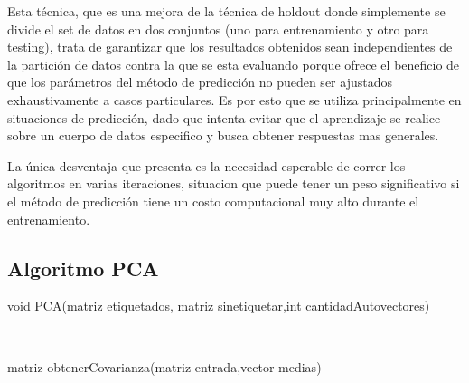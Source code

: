 Esta técnica, que es una mejora de la técnica de holdout donde simplemente se divide el set de datos en dos conjuntos (uno para entrenamiento y otro para testing), trata de garantizar que los resultados obtenidos sean independientes de la partición de datos contra la que se esta evaluando porque ofrece el beneficio de que los parámetros del método de predicción no pueden ser ajustados exhaustivamente a casos particulares. Es por esto que se utiliza principalmente en situaciones de predicción, dado que intenta evitar que el aprendizaje se realice sobre un cuerpo de datos especifico y busca obtener respuestas mas generales.


La única desventaja que presenta es la necesidad esperable de correr los algoritmos en varias iteraciones, situacion que puede tener un peso significativo si el método de predicción tiene un costo computacional muy alto durante el entrenamiento. 

\subsection{Algoritmo PCA}

\newpage
\begin{algorithm}
\begin{algorithmic}[1]\parskip=1mm
\caption{void PCA(matriz etiquetados, matriz sinetiquetar,int cantidadAutovectores)}
\ENDFOR\\
\end{algorithmic}
\end{algorithm}

\begin{algorithm}
\begin{algorithmic}[1]\parskip=1mm
\caption{matriz obtenerCovarianza(matriz entrada,vector medias)}
	\ENDFOR
\ENDFOR
{}
	\ENDFOR
\ENDFOR
{}
\end{algorithmic}
\end{algorithm}


